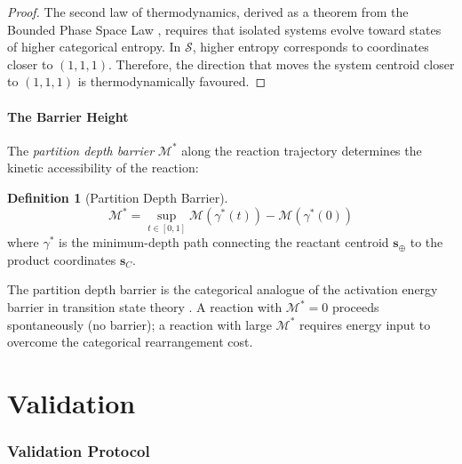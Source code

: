 \documentclass[11pt,twocolumn,a4paper]{article}
\theoremstyle{definition}
\newtheorem{definition}[theorem]{Definition}
\theoremstyle{remark}
\newcommand{\Sspace}{\mathcal{S}}
\newcommand{\Depth}{\mathcal{M}}
\begin{document}
\begin{proof}
The second law of thermodynamics, derived as a theorem from the Bounded Phase Space Law \citep{sachikonye2025a}, requires that isolated systems evolve toward states of higher categorical entropy. In $\Sspace$, higher entropy corresponds to coordinates closer to $(1, 1, 1)$. Therefore, the direction that moves the system centroid closer to $(1, 1, 1)$ is thermodynamically favoured.
\end{proof}

\subsection{The Barrier Height}

The \emph{partition depth barrier} $\Depth^*$ along the reaction trajectory determines the kinetic accessibility of the reaction:

\begin{definition}[Partition Depth Barrier]
\label{def:barrier}
\begin{equation}
\Depth^* = \sup_{t \in [0,1]} \Depth(\gamma^*(t)) - \Depth(\gamma^*(0))
\label{eq:barrier}
\end{equation}
where $\gamma^*$ is the minimum-depth path connecting the reactant centroid $\mathbf{s}_{\oplus}$ to the product coordinates $\mathbf{s}_C$.
\end{definition}

The partition depth barrier is the categorical analogue of the activation energy barrier in transition state theory \citep{eyring1935}. A reaction with $\Depth^* = 0$ proceeds spontaneously (no barrier); a reaction with large $\Depth^*$ requires energy input to overcome the categorical rearrangement cost.



\part{Validation}

\section{Validation Protocol}
\label{sec:validation}
\end{document}
